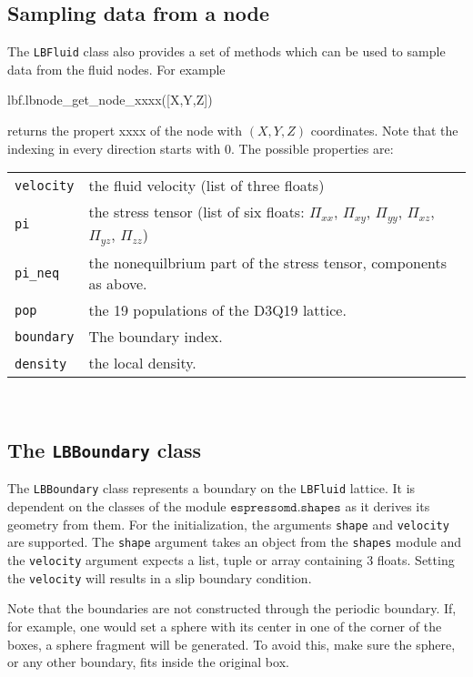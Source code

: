 \subsection*{Sampling data from a node}
The \texttt{LBFluid} class also provides a set of methods which can be used to
sample data from the fluid nodes. For example 
\vspace{0,2cm}
\begin{pypresso}
  lbf.lbnode\_get\_node\_xxxx([X,Y,Z])
\end{pypresso}
\vspace{0,2cm}
returns the propert xxxx of the node with $(X,Y,Z)$ coordinates. Note that the
indexing in every direction starts with 0. The possible properties are:
\vspace{0,8cm}
\begin{tabular}{p{}p{}}
  \texttt{velocity} & the fluid velocity (list of three floats) \\
  \texttt{pi} & the stress tensor (list of six floats: $\Pi_{xx}$, $\Pi_{xy}$, $\Pi_{yy}$, $\Pi_{xz}$,  $\Pi_{yz}$,  $\Pi_{zz}$) \\
  \texttt{pi\_neq} & the nonequilbrium part of the stress tensor, components as above. \\
  \texttt{pop} & the 19 populations of the D3Q19 lattice.\\
  \texttt{boundary} & The boundary index.\\
  \texttt{density}\ & the local density. 
\end{tabular} \\
\vspace{0,8cm}

\subsection*{The \texttt{LBBoundary} class}
The \texttt{LBBoundary} class represents a boundary on the \texttt{LBFluid}
lattice. It is dependent on the classes of the module $\texttt{espressomd.shapes}$ as it
derives its geometry from them. For the initialization, the arguments
\texttt{shape} and \texttt{velocity} are supported. The \texttt{shape} argument
takes an object from the \texttt{shapes} module and the \texttt{velocity}
argument expects a list, tuple or array containing 3 floats. Setting the
\texttt{velocity} will results in a slip boundary condition.

Note that the boundaries are not constructed
through the periodic boundary. If, for example, one would set a sphere with
its center in one of the corner of the boxes, a sphere fragment will be
generated. To avoid this, make sure the sphere, or any other boundary, fits
inside the original box.

